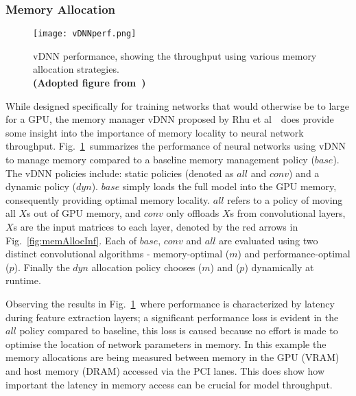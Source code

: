\documentclass[../../D1.tex]{subfiles}
\begin{document}


\subsubsection{Memory Allocation}\label{sec:MemAlloc}
\begin{figure}[H]
    \texttt{[image: vDNNperf.png]} 
    \caption{vDNN performance, showing the throughput using various memory allocation strategies. \\ \textbf{(Adopted figure from~\autocite{rhuVDNNVirtualizedDeep2016})}}
    \label{fig:vDNNperf}   
\end{figure}

While designed specifically for training networks that would otherwise be to large for a GPU, the memory manager vDNN proposed by Rhu et al~\autocite{rhuVDNNVirtualizedDeep2016}~does provide some insight into the importance of memory locality to neural network throughput.
Fig.~\ref{fig:vDNNperf}~summarizes the performance of neural networks using vDNN to manage memory compared to a baseline memory management policy ($base$). The vDNN policies include: static policies (denoted as $all$ and $conv$) and a dynamic policy ($dyn$).
$base$ simply loads the full model into the GPU memory, consequently providing optimal memory locality. $all$ refers to a policy of moving all $X$s out of GPU memory, and $conv$ only offloads $X$s from convolutional layers, $X$s are the input matrices to each layer, denoted by the red arrows in Fig.~\ref{fig:memAllocInf}.
Each of $base$, $conv$ and $all$ are evaluated using two distinct convolutional algorithms - memory-optimal ($m$) and performance-optimal ($p$).
Finally the $dyn$ allocation policy chooses ($m$) and ($p$) dynamically at runtime.

Observing the results in Fig.~\ref{fig:vDNNperf}~where performance is characterized by latency during feature extraction layers; a significant performance loss is evident in the $all$ policy compared to baseline, this loss is caused because no effort is made to optimise the location of network parameters in memory.
In this example the memory allocations are being measured between memory in the GPU (VRAM) and host memory (DRAM) accessed via the PCI lanes. This does show how important the latency in memory access can be crucial for model throughput.
\end{document}
